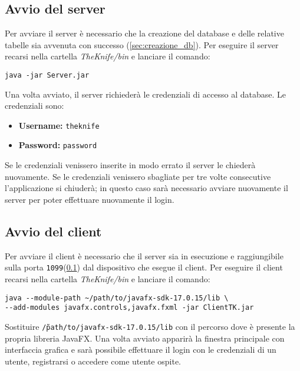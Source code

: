 \subsection{Avvio del server}
\label{sec:avvio_server}
Per avviare il server è necessario che la creazione del database 
e delle relative tabelle sia avvenuta con successo 
(\ref{sec:creazione_db}).
Per eseguire il server recarsi nella cartella \textit{TheKnife/bin} 
e lanciare il comando:
\begin{verbatim}
java -jar Server.jar
\end{verbatim}
Una volta avviato, il server richiederà le credenziali di accesso al database.
Le credenziali sono:
\begin{itemize}
    \item \textbf{Username:} \texttt{theknife}
    \item \textbf{Password:} \texttt{password}
\end{itemize}
Se le credenziali venissero inserite in modo errato il server le 
chiederà nuovamente. Se le credenziali venissero sbagliate per tre volte 
consecutive l'applicazione si chiuderà; in questo caso sarà necessario 
avviare nuovamente il server per poter effettuare nuovamente il login.

\subsection{Avvio del client}
\label{sec:avvio_client}
Per avviare il client è necessario che il server sia in esecuzione
e raggiungibile sulla porta \texttt{1099}(\ref{sec:avvio_server}) dal dispositivo che 
esegue il client.
Per eseguire il client recarsi nella cartella \textit{TheKnife/bin} 
e lanciare il comando:
\begin{verbatim}
java --module-path ~/path/to/javafx-sdk-17.0.15/lib \
--add-modules javafx.controls,javafx.fxml -jar ClientTK.jar
\end{verbatim}
Sostituire \texttt{\~/path/to/javafx-sdk-17.0.15/lib} con 
il percorso dove è presente la propria libreria JavaFX.
Una volta avviato apparirà la finestra principale con interfaccia grafica
e sarà possibile effettuare il login con le credenziali di un utente, 
registrarsi o accedere come utente ospite.
